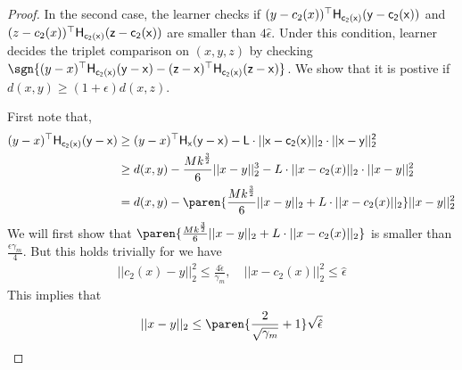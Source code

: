 \begin{proof}

    In the second case, the learner checks if $(y - c_2(x))^{\top}\sf{H}_{c_2(x)}(y - c_2(x))$ and $(z - c_2(x))^{\top}\sf{H}_{c_2(x)}(z - c_2(x))$ are smaller than $4 \hat{\epsilon}$. Under this condition, learner decides the triplet comparison on $(x,y,z)$ by checking  $\sgn{(y - x)^{\top}\sf{H}_{c_2(x)}(y - x) - (z - x)^{\top}\sf{H}_{c_2(x)}(z - x)}$. We show that it is postive if $d(x,y) \ge (1 + \epsilon)d(x,z)$.

    First note that, 
    \begin{subequations}\label{eq: bound1}
    \begin{align}
        (y - x)^{\top}\sf{H}_{c_2(x)}(y - x) &\ge (y - x)^{\top}\sf{H}_{x}(y - x) - L\cdot ||x - c_2(x)||_2\cdot ||x - y||_2^2\\
        &\ge d(x,y) - \frac{M k^{\frac{3}{2}}}{6}||x - y||_2^3 - L\cdot ||x - c_2(x)||_2\cdot ||x - y||_2^2\\
        & = d(x,y) -\paren{\frac{M k^{\frac{3}{2}}}{6}||x - y||_2 + L\cdot ||x - c_2(x)||_2} ||x - y||_2^2
    \end{align}
    \end{subequations}
    We will first show that $\paren{\frac{M k^{\frac{3}{2}}}{6}||x - y||_2 + L\cdot ||x - c_2(x)||_2} $ is smaller than $\frac{\epsilon\gamma_m}{4}$. But this holds trivially for we have
    \begin{align*}
        ||c_2(x) - y||^2_2 \le \frac{4\hat{\epsilon}}{\gamma_m},\quad ||x - c_2(x)||^2_2 \le \hat{\epsilon}
    \end{align*}
    This implies that 
    \begin{align*}
        ||x - y||_2 \le \paren{\frac{2}{\sqrt{\gamma_m}} + 1}\sqrt{\hat{\epsilon}}
    \end{align*}
    

\end{proof}

